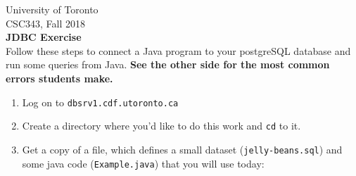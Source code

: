 \documentclass[11pt]{article}
\begin{document}

\noindent
University of Toronto\\
{\sc CSC}343,
Fall 2018\\[10pt]
{\huge \bf JDBC Exercise}\\[10pt]



\noindent
Follow these steps to connect a Java program to your postgreSQL database and run some
queries from Java.
\textbf{See the other side for the most common errors students make.}

\begin{enumerate}
\item  %
Log on to \verb+dbsrv1.cdf.utoronto.ca+
\item  %
Create a directory where you'd like to do this work and \verb+cd+ to it.
\item  %
Get a copy of a file, which defines a small dataset (\verb+jelly-beans.sql+)
and some java code (\verb+Example.java+) that you will use today:


\end{enumerate}
\end{document}
